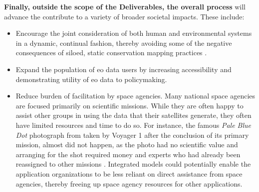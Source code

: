 \documentclass[notitlepage]{article}
\begin{document}
\textbf{Finally, outside the scope of the Deliverables, the overall process} will advance the contribute to a variety of broader societal impacts. These include:
\begin{itemize}
	\item Encourage the joint consideration of both human and environmental systems in a dynamic, continual fashion, thereby avoiding some of the negative consequences of siloed, static conservation mapping practices \cite{harrisRethinkingMapsMorethanhuman2011}. 
	\item Expand the population of \ac{eo} data users by increasing accessibility and demonstrating utility of \ac{eo} data to policymaking.
	\item Reduce burden of facilitation by space agencies. Many national space agencies are focused primarily on scientific missions. While they are often happy to assist other groups in using the data that their satellites generate, they often have limited resources and time to do so. For instance, the famous \textit{Pale Blue Dot} photograph from taken by Voyager 1 after the conclusion of its primary mission, almost did not happen, as the photo had no scientific value and arranging for the shot required money and experts who had already been reassigned to other missions \cite{greenfieldboycePaleBlueDot2010}. Integrated models could potentially enable the application organizations to be less reliant on direct assistance from space agencies, thereby freeing up space agency resources for other applications.
\end{itemize}

\newpage



\end{document}
